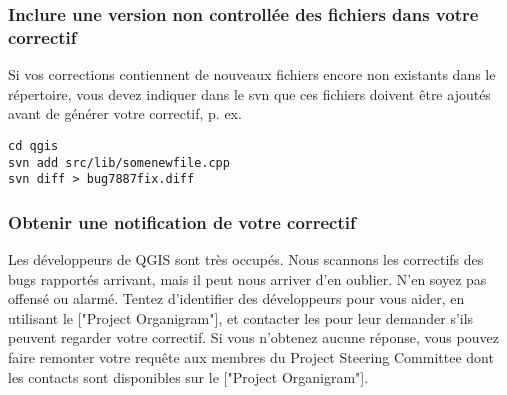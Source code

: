 \subsubsection{Inclure une version non controllée des fichiers dans votre correctif}
Si vos corrections contiennent de nouveaux fichiers encore non existants dans le répertoire, vous devez indiquer dans le svn que ces fichiers doivent être ajoutés avant de générer votre correctif, p. ex.

\begin{verbatim}
cd qgis
svn add src/lib/somenewfile.cpp
svn diff > bug7887fix.diff
\end{verbatim}

\subsubsection{Obtenir une notification de votre correctif}
Les développeurs de QGIS sont très occupés. Nous scannons les correctifs des bugs rapportés arrivant, mais il peut nous arriver d'en oublier. N'en soyez pas offensé ou alarmé. Tentez d'identifier des développeurs pour vous aider, en utilisant le ["Project Organigram"], et contacter les pour leur demander s’ils peuvent regarder votre correctif. Si vous n'obtenez aucune réponse, vous pouvez faire remonter votre requête aux membres du Project Steering Committee dont les contacts sont disponibles sur le ["Project Organigram"].

